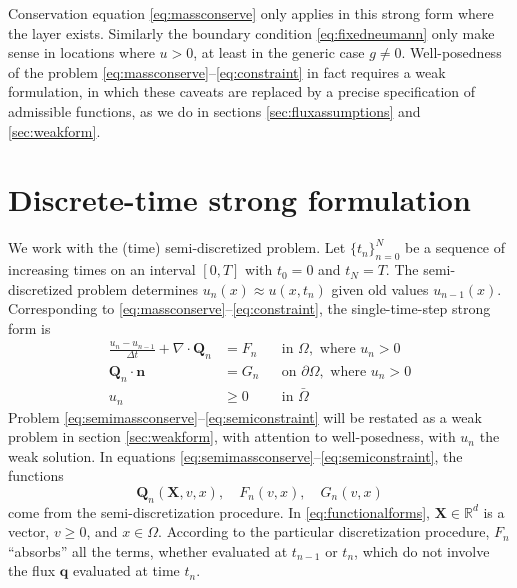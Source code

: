 \documentclass[final,leqno,onefignum,onetabnum]{siamltex1213bueler}
\newcommand\bn{\mathbf{n}}
\newcommand\bq{\mathbf{q}}
\newcommand\bQ{\mathbf{Q}}
\newcommand\bX{\mathbf{X}}
\newcommand{\Div}{\nabla\cdot}
\newcommand\RR{\mathbb{R}}
\begin{document}
Conservation equation \eqref{eq:massconserve} only applies in this strong form where the layer exists.  Similarly the boundary condition \eqref{eq:fixedneumann} only make sense in locations where $u>0$, at least in the generic case $g\ne 0$.  Well-posedness of the problem \eqref{eq:massconserve}--\eqref{eq:constraint} in fact requires a weak formulation, in which these caveats are replaced by a precise specification of admissible functions, as we do in sections \ref{sec:fluxassumptions} and \ref{sec:weakform}.


\section{Discrete-time strong formulation}  \label{sec:discreteform}

We work with the (time) semi-discretized problem.  Let $\{t_n\}_{n=0}^N$ be a sequence of increasing times on an interval $[0,T]$ with $t_0=0$ and $t_N=T$.  The semi-discretized problem determines $u_n(x) \approx u(x,t_n)$ given old values $u_{n-1}(x)$.  Corresponding to \eqref{eq:massconserve}--\eqref{eq:constraint}, the single-time-step strong form is
\begin{align}
\frac{u_n - u_{n-1}}{\Delta t} + \Div \bQ_n &= F_n &&\text{in } \Omega, \text{ where } u_n > 0 \label{eq:semimassconserve} \\
\bQ_n \cdot \bn &= G_n &&\text{on } \partial\Omega, \text{ where } u_n > 0 \label{eq:semifixedneumann} \\
u_n &\ge 0 &&\text{in } \bar\Omega \label{eq:semiconstraint}
\end{align}
Problem \eqref{eq:semimassconserve}--\eqref{eq:semiconstraint} will be restated as a weak problem in section \ref{sec:weakform}, with attention to well-posedness, with $u_n$ the weak solution.  In equations \eqref{eq:semimassconserve}--\eqref{eq:semiconstraint}, the functions
\begin{equation}
\bQ_n(\bX,v,x), \quad F_n(v,x), \quad G_n(v,x)\label{eq:functionalforms}
\end{equation}
come from the semi-discretization procedure.  In \eqref{eq:functionalforms}, $\bX\in\RR^d$ is a vector, $v\ge 0$, and $x\in \Omega$.  According to the particular discretization procedure, $F_n$ ``absorbs'' all the terms, whether evaluated at $t_{n-1}$ or $t_n$, which do not involve the flux $\bq$ evaluated at time $t_n$.
\end{document}
